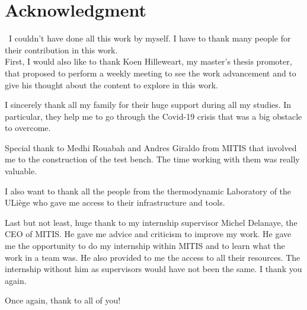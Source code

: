 \chapter*{Acknowledgment}
\quad\ I couldn't have done all this work by myself. I have to thank many people for their contribution in this work.\\


First, I would also like to thank Koen Hilleweart, my master’s thesis promoter, that proposed to perform a weekly meeting to see the work advancement and to give his thought about the content to explore in this work.

I sincerely thank all my family for their huge support during all my studies. In particular, they help me to go through the Covid-19 crisis that was a big obstacle to overcome.

Special thank to Medhi Rouabah and Andres Giraldo from MITIS that involved me to the construction of the test bench. The time working with them was really valuable.

I also want to thank all the people from the thermodynamic Laboratory of the ULiège who gave me access to their infrastructure and tools.

Last but not least, huge thank to my internship supervisor Michel Delanaye, the CEO of MITIS. He gave me advice and criticism to improve my work. He gave me the opportunity to do my internship within MITIS and to learn what the work in a team was. He also provided to me the access to all their resources. The internship without him as supervisors would have not been the same. I thank you again.

Once again, thank to all of you!
\newpage